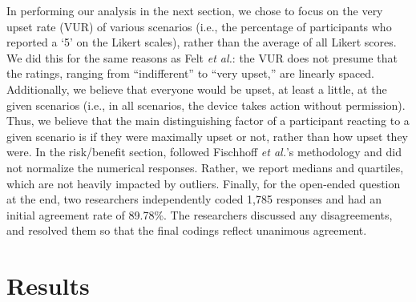 \documentclass{acm_proc_article-sp}
\begin{document}
In performing our analysis in the next section, we chose to focus on the very upset rate (VUR) of various scenarios (i.e., the percentage of participants who reported a `5' on the Likert scales), rather than the average of all Likert scores. We did this for the same reasons as Felt {\it et al.}: the VUR does not presume that the ratings, ranging from ``indifferent'' to ``very upset,'' are linearly spaced. Additionally, we believe that everyone would be upset, at least a little, at the given scenarios (i.e., in all scenarios, the device takes action without permission). Thus, we believe that the main distinguishing factor of a participant reacting to a given scenario is if they were maximally upset or not, rather than how upset they were. In the risk/benefit section, followed Fischhoff {\it et al.}'s methodology and did not normalize the numerical responses. Rather, we report medians and quartiles, which are not heavily impacted by outliers. Finally, for the open-ended question at the end, two researchers independently coded 1,785 responses and had an initial agreement rate of 89.78\%. The researchers discussed any disagreements, and resolved them so that the final codings reflect unanimous agreement.


\section{Results}

\end{document}
